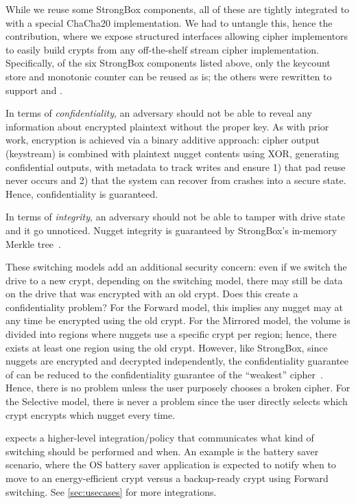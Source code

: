 While we reuse some StrongBox components, all of these are tightly integrated to
with a special ChaCha20 implementation. We had to untangle this, hence the \sysB
contribution, where we expose structured interfaces allowing cipher implementors
to easily build crypts from any off-the-shelf stream cipher implementation.
Specifically, of the six StrongBox components listed above, only the keycount
store and monotonic counter can be reused as is; the others were rewritten to
support \sysA and \sysB.


 In terms of {\em confidentiality}, an
adversary should not be able to reveal any information about encrypted plaintext
without the proper key. As with prior work, encryption is achieved via a binary
additive approach: cipher output (keystream) is combined with plaintext nugget
contents using XOR, generating confidential outputs, with metadata to track
writes and ensure 1) that pad reuse never occurs and 2) that the system can
recover from crashes into a secure state. Hence, confidentiality is guaranteed.

In terms of {\em integrity}, an adversary should not be able to tamper with
drive state and it go unnoticed. Nugget integrity is guaranteed by StrongBox's
in-memory Merkle tree~\cite{StrongBox}.

These switching models add an additional security concern: even if we switch the
drive to a new crypt, depending on the switching model, there may still be data
on the drive that was encrypted with an old crypt. Does this create a
confidentiality problem? For the Forward model, this implies any nugget may at
any time be encrypted using the old crypt. For the Mirrored model, the volume is
divided into regions where nuggets use a specific crypt per region; hence, there
exists at least one region using the old crypt. However, like StrongBox, since
nuggets are encrypted and decrypted independently, the confidentiality guarantee
of \sys can be reduced to the confidentiality guarantee of the ``weakest''
cipher~\cite{StrongBox}. Hence, there is no problem unless the user purposely
chooses a broken cipher. For the Selective model, there is never a problem since
the user directly selects which crypt encrypts which nugget every time.

 \sys expects a higher-level integration/policy
that communicates what kind of switching should be performed and when. An
example is the battery saver scenario, where the OS battery saver application is
expected to notify \sys when to move to an energy-efficient crypt versus a
backup-ready crypt using Forward switching. See \cref{sec:usecases} for more
integrations.

